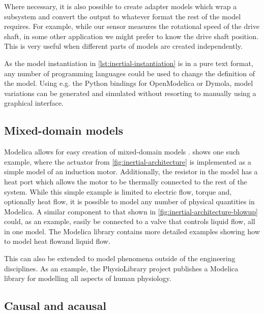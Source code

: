 \documentclass[\rootfolder/main.tex]{subfiles}
\begin{document}
Where necessary, it is also possible to create adapter models which wrap a subsystem and convert the output to whatever format the rest of the model requires.
For example, while our sensor measures the rotational speed of the drive shaft, in some other application we might prefer to know the drive shaft position.
This is very useful when different parts of models are created independently.

As the model instantiation in \cref{lst:inertial-instantiation} is in a pure text format, any number of programming languages could be used to change the definition of the model.
Using e.g. the Python bindings for OpenModelica or Dymola, model variations can be generated and simulated without resorting to manually using a graphical interface.

\subsection{Mixed-domain models}

Modelica allows for easy creation of mixed-domain models \cite{clauss2002}.
 shows one such example, where the actuator from \cref{fig:inertial-architecture} is implemented as a simple model of an induction motor.
Additionally, the resistor in the model has a heat port which allows the motor to be thermally connected to the rest of the system.
While this simple example is limited to electric flow, torque and, optionally heat flow, it is possible to model any number of physical quantities in Modelica.
A similar component to that shown in \cref{fig:inertial-architecture-blowup} could, as an example, easily be connected to a valve that controls liquid flow, all in one model.
The Modelica library contains more detailed examples showing how to model heat flow\footnotemark and liquid flow\footnotemark.


This can also be extended to model phenomena outside of the engineering disciplines.
As an example, the PhysioLibrary project publishes a Modelica library for modelling all aspects of human physiology.

\subsection{Causal and acausal}
\end{document}
